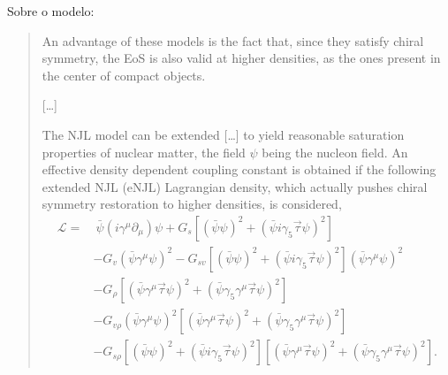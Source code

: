Sobre o modelo\parencite{Pais}:
\begin{quote}
An advantage of these models is the fact that, since they satisfy chiral symmetry, the EoS is also valid at higher densities, as the ones present in the center of compact objects.

[\dots]

The NJL model can be extended [\dots] to yield reasonable saturation properties of nuclear matter, the field $\psi$ being the nucleon field. An effective density dependent coupling constant is obtained if the following extended NJL (eNJL) Lagrangian density, which actually pushes chiral symmetry restoration to higher densities, is considered,
\begin{equation}\label{Eq:Lagrangiana_eNLJ_Pais}
\begin{split}
	\mathcal{L} =&~ \bar{\psi}(i\gamma^\mu\partial_\mu)\psi + G_s[(\bar{\psi}\psi)^2 + (\bar{\psi}i\gamma_5\vec{\tau}\psi)^2] \\
	& - G_v(\bar{\psi}\gamma^\mu\psi)^2 - G_{sv}[(\bar{\psi}\psi)^2 + (\bar{\psi}i\gamma_5\vec{\tau}\psi)^2](\bar{\psi}\gamma^\mu\psi)^2 \\
	& - G_\rho[(\bar{\psi}\gamma^\mu\vec{\tau}\psi)^2 + (\bar{\psi}\gamma_5\gamma^\mu\vec{\tau}\psi)^2] \\
	& - G_{v\rho}(\bar{\psi}\gamma^\mu\psi)^2[(\bar{\psi}\gamma^\mu\vec{\tau}\psi)^2 + (\bar{\psi}\gamma_5\gamma^\mu\vec{\tau}\psi)^2] \\
	& - G_{s\rho} [(\bar{\psi}\psi)^2 + (\bar{\psi}i\gamma_5\vec{\tau}\psi)^2][(\bar{\psi}\gamma^\mu\vec{\tau}\psi)^2 + (\bar{\psi}\gamma_5\gamma^\mu\vec{\tau}\psi)^2].
\end{split}
\end{equation}
\end{quote}


